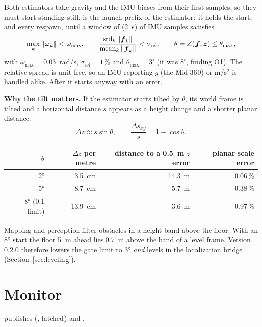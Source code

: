 Both estimators take gravity and the IMU biases from their first samples, so they must start
standing still.  is the launch prefix of the estimator: it holds the start, and
every respawn, until a window of  (2~s) of IMU samples satisfies
\begin{equation}
  \max_k \|\boldsymbol{\omega}_k\| < \omega_{\max}, \qquad
  \frac{\operatorname{std}_k \|\boldsymbol{f}_k\|}{\operatorname{mean}_k \|\boldsymbol{f}_k\|} <
  \sigma_{\mathrm{rel}}, \qquad
  \theta = \angle(\bar{\boldsymbol{f}}, \boldsymbol{z}) \le \theta_{\max},
\end{equation}
with $\omega_{\max} = 0.03$~rad/s, $\sigma_{\mathrm{rel}} = 1\,\%$ and $\theta_{\max} = 3^\circ$
(it was $8^\circ$, finding O1). The relative spread is unit-free, so an IMU reporting $g$ (the
Mid-360) or m/s$^2$ is handled alike. After  it starts anyway with an error.

\textbf{Why the tilt matters.} If the estimator starts tilted by $\theta$, its world frame is
tilted and a horizontal distance $s$ appears as a height change and a shorter planar distance:
\begin{equation}
  \Delta z \approx s\sin\theta, \qquad \frac{\Delta s_{xy}}{s} = 1 - \cos\theta .
\end{equation}
\begin{center}
\begin{tabular}{@{}rrrr@{}}
  \toprule
  $\theta$ & $\Delta z$ per metre & distance to a 0.5~m $z$ error & planar scale error \\
  \midrule
  2° & 3.5~cm & 14.3~m & 0.06\,\% \\
  5° & 8.7~cm & 5.7~m & 0.38\,\% \\
  8° (0.1 limit) & 13.9~cm & 3.6~m & 0.97\,\% \\
  \bottomrule
\end{tabular}
\end{center}
Mapping and perception filter obstacles in a height band above the floor. With an 8° start the
floor 5~m ahead lies 0.7~m above the band of a level frame. Version 0.2.0 therefore lowers the
gate limit to 3° \emph{and} levels  in the localization bridge
(Section~\ref{sec:leveling}).

\section{Monitor}

 publishes  (, latched)
and .

